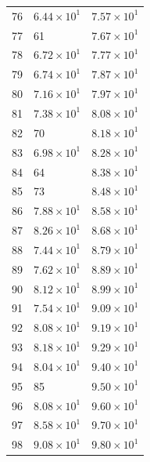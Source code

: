 \begin{table}[H]
\begin{tabular}{lll}
76 & $\displaystyle 6.44 \times 10^{1}$ & $\displaystyle 7.57 \times 10^{1}$ \\
77 & 61 & $\displaystyle 7.67 \times 10^{1}$ \\
78 & $\displaystyle 6.72 \times 10^{1}$ & $\displaystyle 7.77 \times 10^{1}$ \\
79 & $\displaystyle 6.74 \times 10^{1}$ & $\displaystyle 7.87 \times 10^{1}$ \\
80 & $\displaystyle 7.16 \times 10^{1}$ & $\displaystyle 7.97 \times 10^{1}$ \\
81 & $\displaystyle 7.38 \times 10^{1}$ & $\displaystyle 8.08 \times 10^{1}$ \\
82 & 70 & $\displaystyle 8.18 \times 10^{1}$ \\
83 & $\displaystyle 6.98 \times 10^{1}$ & $\displaystyle 8.28 \times 10^{1}$ \\
84 & 64 & $\displaystyle 8.38 \times 10^{1}$ \\
85 & 73 & $\displaystyle 8.48 \times 10^{1}$ \\
86 & $\displaystyle 7.88 \times 10^{1}$ & $\displaystyle 8.58 \times 10^{1}$ \\
87 & $\displaystyle 8.26 \times 10^{1}$ & $\displaystyle 8.68 \times 10^{1}$ \\
88 & $\displaystyle 7.44 \times 10^{1}$ & $\displaystyle 8.79 \times 10^{1}$ \\
89 & $\displaystyle 7.62 \times 10^{1}$ & $\displaystyle 8.89 \times 10^{1}$ \\
90 & $\displaystyle 8.12 \times 10^{1}$ & $\displaystyle 8.99 \times 10^{1}$ \\
91 & $\displaystyle 7.54 \times 10^{1}$ & $\displaystyle 9.09 \times 10^{1}$ \\
92 & $\displaystyle 8.08 \times 10^{1}$ & $\displaystyle 9.19 \times 10^{1}$ \\
93 & $\displaystyle 8.18 \times 10^{1}$ & $\displaystyle 9.29 \times 10^{1}$ \\
94 & $\displaystyle 8.04 \times 10^{1}$ & $\displaystyle 9.40 \times 10^{1}$ \\
95 & 85 & $\displaystyle 9.50 \times 10^{1}$ \\
96 & $\displaystyle 8.08 \times 10^{1}$ & $\displaystyle 9.60 \times 10^{1}$ \\
97 & $\displaystyle 8.58 \times 10^{1}$ & $\displaystyle 9.70 \times 10^{1}$ \\
98 & $\displaystyle 9.08 \times 10^{1}$ & $\displaystyle 9.80 \times 10^{1}$ \\

\end{tabular}
\end{table}
